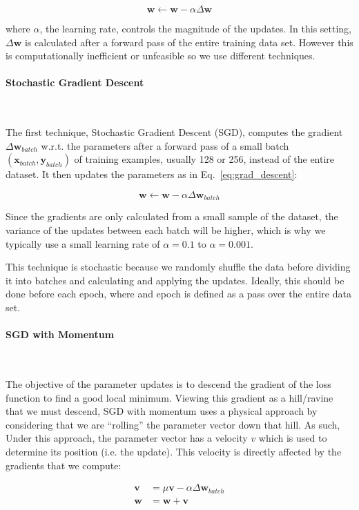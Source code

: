 \documentclass[12pt,twoside]{article}
\newcommand{\para}[1]{\paragraph{#1}\mbox{}\\}
\begin{document}
\begin{equation}
  \bm{w} \leftarrow \bm{w} - \alpha \Delta\bm{w}
  \label{eq:grad_descent}
\end{equation}

where $\alpha$, the learning rate, controls the magnitude of the updates. In this
setting, $\Delta\bm{w}$ is calculated after a forward pass of the entire
training data set. However this is computationally inefficient or unfeasible so
we use different techniques.

\para{Stochastic Gradient Descent}\label{para:sgd}

The first technique, Stochastic Gradient Descent (SGD), computes the gradient
$\Delta\bm{w}_{batch}$ w.r.t. the parameters after a forward pass of a small batch 
$(\bm{x}_{batch}, \bm{y}_{batch})$ of training examples, 
usually 128 or 256, instead of the entire dataset.
It then updates the parameters as in Eq.~\eqref{eq:grad_descent}:

\begin{equation}
  \bm{w} \leftarrow \bm{w} - \alpha \Delta\bm{w}_{batch}
  \label{eq:sgd}
\end{equation}

Since the gradients are only calculated from a small sample of the dataset,
the variance of the updates between each batch will be higher, which is why we
typically use a small learning rate of $\alpha = 0.1$ to $\alpha = 0.001$.

This technique is stochastic because we randomly shuffle the data before
dividing it into batches and calculating and applying the updates. Ideally,
this should be done before each epoch, where and epoch is defined as a pass
over the entire data set.

\para{SGD with Momentum}\label{para:sgd_momentum}

The objective of the parameter updates is to descend the gradient of the loss
function to find a good local minimum. Viewing this gradient as a hill/ravine
that we must descend, SGD with momentum uses a physical approach by
considering that we are ``rolling'' the parameter vector down that hill. As such,
Under this approach, the parameter vector has a velocity $v$ which is used to
determine its position (i.e. the update). This velocity is directly affected by
the gradients that we compute:

\begin{align}
  \bm{v} &= \mu \bm{v} - \alpha \Delta \bm{w}_{batch}\\
  \bm{w} &= \bm{w} + \bm{v}
  \label{eq:sgd_momentum}
\end{align}
\end{document}
